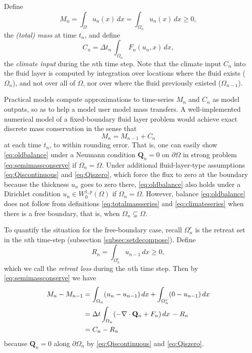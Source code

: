 \documentclass[final,leqno,onefignum,onetabnum]{siamltex1213bueler}
\newcommand\bQ{\mathbf{Q}}
\newcommand{\Div}{\nabla\cdot}
\begin{document}
Define
\begin{equation}
M_n = \int_\Omega u_n(x)\,dx = \int_{\Omega_n} u_n(x)\,dx \ge 0, \label{eq:totalmassseries}
\end{equation}
the \emph{(total) mass} at time $t_n$, and define
\begin{equation}
C_n = \Delta t_n\, \int_{\Omega_n} F_n(u_n,x)\,dx, \label{eq:climateseries}
\end{equation}
the \emph{climate input} during the $n$th time step.  Note that the climate input $C_n$ into the fluid layer is computed by integration over locations where the fluid exists ($\Omega_n$), and not over all of $\Omega$, nor over where the fluid previously existed ($\Omega_{n-1}$).

Practical models compute approximations to time-series $M_n$ and $C_n$ as model outputs, so as to help a model user model mass transfers.  A well-implemented numerical model of a fixed-boundary fluid layer problem would achieve exact discrete mass conservation in the sense that
\begin{equation}
M_n = M_{n-1} + C_n \label{eq:oldbalance}
\end{equation}
at each time $t_n$, to within rounding error.  That is, one can easily show \eqref{eq:oldbalance} under a Neumann condition $\bQ_n=0$ on $\partial \Omega$ in strong problem \eqref{eq:semimassconserve} if $\Omega_n=\Omega$.  Under additional fluid-layer-type assumptions \eqref{eq:Qiscontinuous} and \eqref{eq:Qiszero}, which force the flux to zero at the boundary because the thickness $u_n$ goes to zero there, \eqref{eq:oldbalance} also holds under a Dirichlet condition $u_n\in W_0^{1,p}(\Omega)$ if $\Omega_n=\Omega$.  However, balance \eqref{eq:oldbalance} does not follow from definitions \eqref{eq:totalmassseries} and \eqref{eq:climateseries} when there is a free boundary, that is, when $\Omega_n \subsetneq \Omega$.

To quantify the situation for the free-boundary case, recall $\Omega_n^r$ is the retreat set in the $n$th time-step (subsection \ref{subsec:setdecompose}).  Define
\begin{equation}
R_n = \int_{\Omega_n^r} u_{n-1}\,dx \ge 0, \label{eq:retreatlossseries}
\end{equation}
which we call the \emph{retreat loss} during the $n$th time step.  Then by \eqref{eq:semimassconserve} we have
\begin{align}
M_n - M_{n-1} &= \int_{\Omega_n} (u_n - u_{n-1})\,dx + \int_{\Omega_n^r} (0 - u_{n-1})\,dx \label{eq:newbalance} \\
   &= \Delta t \int_{\Omega_n} (- \Div \bQ_n + F_n) \,dx \, - R_n \notag \\
   &= C_n - R_n \notag
\end{align}
because $\bQ_n=0$ along $\partial \Omega_n$ by \eqref{eq:Qiscontinuous} and \eqref{eq:Qiszero}.
\end{document}
